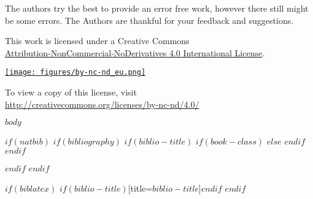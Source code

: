 \documentclass[12pt,a4paper, twoside=false]{scrartcl}
\begin{document}
\begin{titlepage}
\begin{center}
	\vspace{0.5 cm}
    The authors try the best to provide an error free work, however there still might be some errors. The Authors are thankful for your feedback and suggestions.
    \vfill
   	\end{center}

    \begin{center}
          This work is licensed under a Creative Commons \\
          \href{http://creativecommons.org/licenses/by-nc-nd/4.0/}{Attribution-NonCommercial-NoDerivatives 4.0 International License}.\\
      \end{center}
      \begin{center}
        \href{http://creativecommons.org/licenses/by-nc-nd/4.0/}{\texttt{[image: figures/by-nc-nd\_eu.png]}}
      \end{center}
      \begin{center}
          To view a copy of this license, visit\\
          \href{http://creativecommons.org/licenses/by-nc-nd/4.0/}{http://creativecommons.org/licenses/by-nc-nd/4.0/}\\
    \end{center}

\end{titlepage}




$body$

$if(natbib)$
$if(bibliography)$
$if(biblio-title)$
$if(book-class)$
\renewcommand\bibname{$biblio-title$}
$else$
\renewcommand\refname{$biblio-title$}
$endif$
$endif$

$endif$
$endif$

$if(biblatex)$
\printbibliography$if(biblio-title)$[title=$biblio-title$]$endif$
$endif$
\end{document}
